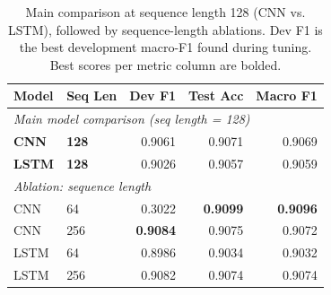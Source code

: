 \begin{table}[h]
\centering
\small
\begin{tabular}{llrrr}
\toprule
\textbf{Model} & \textbf{Seq Len} & \textbf{Dev F1} & \textbf{Test Acc} & \textbf{Macro F1} \\
\midrule
\multicolumn{5}{l}{\textit{Main model comparison (seq length = 128)}} \\
\textbf{CNN} & \textbf{128} & 0.9061 & 0.9071 & 0.9069 \\
\textbf{LSTM} & \textbf{128} & 0.9026 & 0.9057 & 0.9059 \\
\midrule
\multicolumn{5}{l}{\textit{Ablation: sequence length}} \\
CNN & 64 & 0.3022 & \textbf{0.9099} & \textbf{0.9096} \\
CNN & 256 & \textbf{0.9084} & 0.9075 & 0.9072 \\
LSTM & 64 & 0.8986 & 0.9034 & 0.9032 \\
LSTM & 256 & 0.9082 & 0.9074 & 0.9074 \\
\bottomrule
\end{tabular}
\caption{Main comparison at sequence length 128 (CNN vs. LSTM), followed by sequence-length ablations. Dev F1 is the best development macro-F1 found during tuning. Best scores per metric column are bolded.}
\label{tab:test_results}
\end{table}

